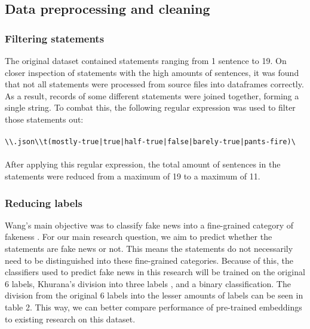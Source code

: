 \subsection{Data preprocessing and cleaning}
\subsubsection{Filtering statements}
The original dataset contained statements ranging from 1 sentence to 19. 
On closer inspection of statements with the high amounts of sentences, it was found that not all statements were processed from source files into dataframes correctly.
As a result, records of some different statements were joined together, forming a single string.
To combat this, the following regular expression was used to filter those statements out:\\
\\
\verb/\\.json\\t(mostly-true|true|half-true|false|barely-true|pants-fire)\/\\
\\
After applying this regular expression, the total amount of sentences in the statements were reduced from a maximum of 19 to a maximum of 11. 

\subsubsection{Reducing labels}

Wang's main objective was to classify fake news into a fine-grained category of fakeness \cite{wang2018}.
For our main research question, we aim to predict whether the statements are fake news or not. 
This means the statements do not necessarily need to be distinguished into these fine-grained categories.
Because of this, the classifiers used to predict fake news in this research will be trained on the original 6 labels, Khurana's division into three labels \cite{khurana2017}, and a binary classification.
The division from the original 6 labels into the lesser amounts of labels can be seen in table 2. 
This way, we can better compare performance of pre-trained embeddings to existing research on this dataset.

